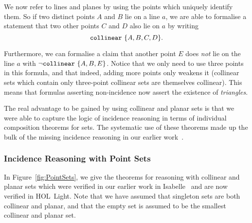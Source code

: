 We now refer to lines and planes by using the points which uniquely identify them. So if two distinct points $A$ and $B$ lie on a line $a$, we are able to formalise a statement that two other points $C$ and $D$ also lie on $a$ by writing
\begin{displaymath}
\texttt{collinear}\ \{A, B, C, D\}.
\end{displaymath}

Furthermore, we can formalise a claim that another point $E$ does \emph{not} lie on the line $a$ with $\neg \texttt{collinear}\ \{A, B, E\}$. Notice that we only need to use three points in this formula, and that indeed, adding more points only weakens it (collinear sets which contain only three-point collinear sets are themselves collinear). This means that formulas asserting non-incidence now assert the existence of \emph{triangles}.

The real advantage to be gained by using collinear and planar sets is that we were able to capture the logic of incidence reasoning in terms of individual composition theorems for sets. The systematic use of these theorems made up the bulk of the missing incidence reasoning in our earlier work~\cite{ScottMScThesis}.

\subsubsection{Incidence Reasoning with Point Sets}\label{sec:PointSets}
In Figure~\ref{fig:PointSets}, we give the theorems for reasoning with collinear and planar sets which were verified in our earlier work in Isabelle~\cite{ScottMScThesis} and are now verified in HOL~Light. Note that we have assumed that singleton sets are both collinear and planar, and that the empty set is assumed to be the smallest collinear and planar set.

